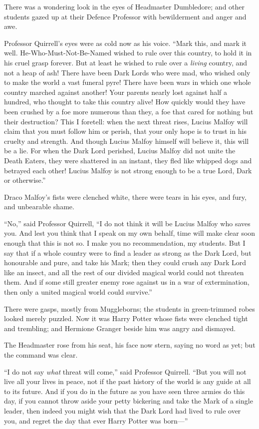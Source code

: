 There was a wondering look in the eyes of Headmaster Dumbledore; and other
students gazed up at their Defence Professor with bewilderment and anger and
awe.

Professor Quirrell’s eyes were as cold now as his voice. “Mark this, and mark
it well. He-Who-Must-Not-Be-Named wished to rule over this country, to hold it
in his cruel grasp forever. But at least he wished to rule over a \emph{living}
country, and not a heap of ash! There have been Dark Lords who were mad, who
wished only to make the world a vast funeral pyre! There have been wars in
which one whole country marched against another! Your parents nearly lost
against half a hundred, who thought to take this country alive! How quickly
would they have been crushed by a foe more numerous than they, a foe that cared
for nothing but their destruction? This I foretell: when the next threat rises,
Lucius Malfoy will claim that you must follow him or perish, that your only
hope is to trust in his cruelty and strength. And though Lucius Malfoy himself
will believe it, this will be a lie. For when the Dark Lord perished, Lucius
Malfoy did not unite the Death Eaters, they were shattered in an instant, they
fled like whipped dogs and betrayed each other! Lucius Malfoy is not strong
enough to be a true Lord, Dark or otherwise.”

Draco Malfoy’s fists were clenched white, there were tears in his eyes, and
fury, and unbearable shame.

“No,” said Professor Quirrell, “I do not think it will be Lucius Malfoy who
saves you. And lest you think that I speak on my own behalf, time will make
clear soon enough that this is not so. I make you no recommendation, my
students. But I say that if a whole country were to find a leader as strong as
the Dark Lord, but honourable and pure, and take his Mark; then they could crush
any Dark Lord like an insect, and all the rest of our divided magical world
could not threaten them. And if some still greater enemy rose against us in a
war of extermination, then only a united magical world could survive.”

There were gasps, mostly from Muggleborns; the students in green-trimmed robes
looked merely puzzled. Now it was Harry Potter whose fists were clenched tight
and trembling; and Hermione Granger beside him was angry and dismayed.

The Headmaster rose from his seat, his face now stern, saying no word as yet;
but the command was clear.

“I do not say \emph{what} threat will come,” said Professor Quirrell. “But you
will not live all your lives in peace, not if the past history of the world is
any guide at all to its future. And if you do in the future as you have seen
three armies do this day, if you cannot throw aside your petty bickering and
take the Mark of a single leader, then indeed you might wish that the Dark Lord
had lived to rule over you, and regret the day that ever Harry Potter was
born—”

